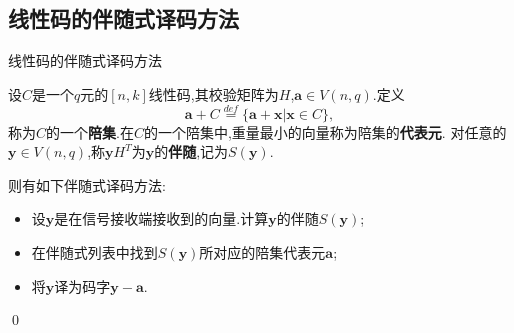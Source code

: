 \documentclass{beamer}
\begin{document}
	\subsection{线性码的伴随式译码方法}
	\begin{frame}{线性码的伴随式译码方法}
		\begin{definition}[陪集、代表元及伴随]
			\qquad 设$C$是一个$q$元的$[n,k]$线性码,其校验矩阵为$H$,$\mathbf{a}\in V(n,q)$.定义
			$$\mathbf{a}+C\overset{def}{=}\{\mathbf{a}+\mathbf{x}|\mathbf{x}\in C\},$$
			称为$C$的一个\textbf{陪集}.在$C$的一个陪集中,重量最小的向量称为陪集的\textbf{代表元}.
			对任意的$\mathbf{y}\in V(n,q)$,称$\mathbf{y}H^T$为$\mathbf{y}$的\textbf{伴随},记为$S(\mathbf{y})$.
		\end{definition}
		\noindent 则有如下伴随式译码方法:
		\begin{itemize}
			\item 设$\mathbf{y}$是在信号接收端接收到的向量.计算$\mathbf{y}$的伴随$S(\mathbf{y})$;
			\item 在伴随式列表中找到$S(\mathbf{y})$所对应的陪集代表元$\mathbf{a}$;
			\item 将$\mathbf{y}$译为码字$\mathbf{y}-\mathbf{a}$.
		\end{itemize}
		\qed
	\end{frame}
\end{document}

